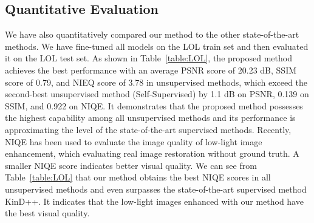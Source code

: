 \documentclass[journal]{IEEEtran}
\begin{document}
\subsection{Quantitative Evaluation}
We have also quantitatively compared our method to the other state-of-the-art methods. We have fine-tuned all models on the LOL train set and then evaluated it on the LOL test set. As shown in Table~\ref{table:LOL}, the proposed method achieves the best performance with an average PSNR score of 20.23 dB, SSIM score of 0.79, and NIEQ score of 3.78 in unsupervised methods, which exceed the second-best unsupervised method (Self-Supervised) by 1.1 dB on PSNR, 0.139 on SSIM, and 0.922 on NIQE. It demonstrates that the proposed method possesses the highest capability among all unsupervised methods and its performance is approximating the level of the state-of-the-art supervised methods. Recently, NIQE has been used to evaluate the image quality of low-light image enhancement, which evaluating real image restoration without ground truth. A smaller NIQE score indicates better visual quality. We can see from Table~\ref{table:LOL} that our method obtains the best NIQE scores in all unsupervised methods and even surpasses the state-of-the-art supervised method KinD++. It indicates that the low-light images enhanced with our method have the best visual quality.
\end{document}
